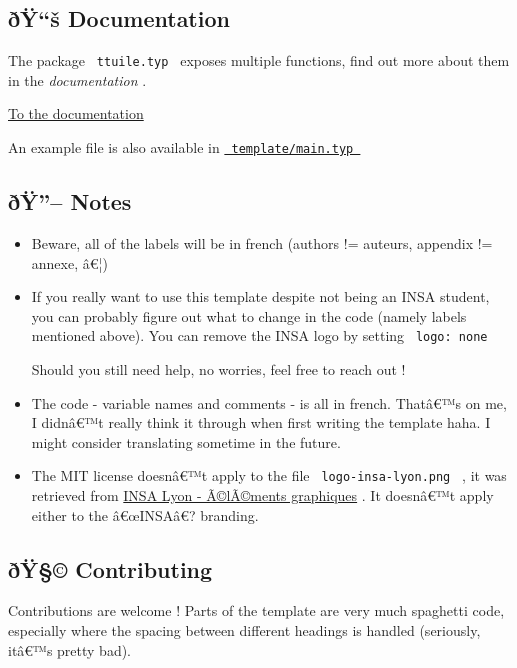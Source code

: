 \subsection{ðŸ``š Documentation}\label{uxf0uxffux161-documentation}

The package \texttt{\ ttuile.typ\ } exposes multiple functions, find out
more about them in the \emph{documentation} .

\href{https://github.com/vitto4/ttuile/blob/main/DOC.EN.md}{To the
documentation}

An example file is also available in
\href{https://github.com/vitto4/ttuile/blob/main/template/main.typ}{\texttt{\ template/main.typ\ }}

\subsection{ðŸ''-- Notes}\label{uxf0uxff-notes}

\begin{itemize}
\item
  Beware, all of the labels will be in french (authors != auteurs,
  appendix != annexe, â€¦)
\item
  If you really want to use this template despite not being an INSA
  student, you can probably figure out what to change in the code
  (namely labels mentioned above). You can remove the INSA logo by
  setting \texttt{\ logo:\ none\ }

  Should you still need help, no worries, feel free to reach out !
\item
  The code - variable names and comments - is all in french. Thatâ€™s on
  me, I didnâ€™t really think it through when first writing the template
  haha. I might consider translating sometime in the future.
\item
  The MIT license doesnâ€™t apply to the file
  \texttt{\ logo-insa-lyon.png\ } , it was retrieved from
  \href{https://www.insa-lyon.fr/fr/elements-graphiques}{INSA Lyon -
  Ã©lÃ©ments graphiques} . It doesnâ€™t apply either to the â€œINSAâ€?
  branding.
\end{itemize}

\subsection{ðŸ§© Contributing}\label{uxf0uxff-contributing}

Contributions are welcome ! Parts of the template are very much
spaghetti code, especially where the spacing between different headings
is handled (seriously, itâ€™s pretty bad).

